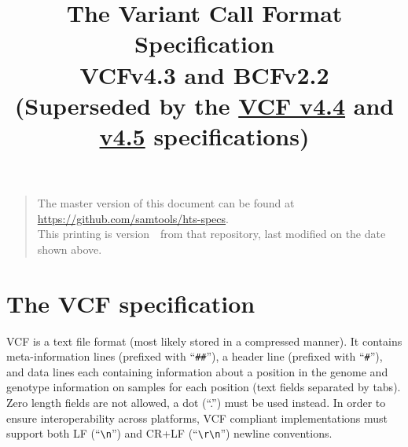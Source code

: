 \documentclass[8pt]{article}
\begin{document}

\title{The Variant Call Format Specification \\ \vspace{0.5em} \large VCFv4.3 and BCFv2.2
\normalsize\\[2ex]
(Superseded by the \href{http://samtools.github.io/hts-specs/VCFv4.4.pdf}{VCF v4.4} and \href{http://samtools.github.io/hts-specs/VCFv4.5.pdf}{v4.5} specifications)}
\date{\headdate}
\maketitle
\begin{quote}\small
The master version of this document can be found at \url{https://github.com/samtools/hts-specs}.\\
This printing is version~\commitdesc\ from that repository, last modified on the date shown above.
\end{quote}
\vspace*{1em}

\newpage
\tableofcontents
\newpage

\section{The VCF specification}
VCF is a text file format (most likely stored in a compressed manner).
It contains meta-information lines (prefixed with ``\verb|##|''), a header line (prefixed with ``\verb|#|''), and data lines each containing information about a position in the genome and genotype information on samples for each position (text fields separated by tabs).
Zero length fields are not allowed, a dot (``.'') must be used instead.
In order to ensure interoperability across platforms, VCF compliant implementations must support both LF (``\verb|\n|'') and CR+LF (``\verb|\r\n|'') newline conventions.
\end{document}
